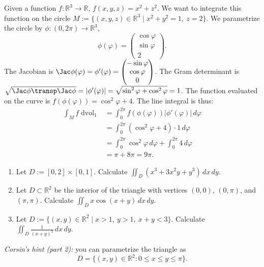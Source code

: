\begin{example}
\label{ex:line_integral_function_circle}
Given a function $f: \mathbb{R}^3 \to \mathbb{R}$, $f(x,y,z) = x^2+z^2$. We want to integrate this function on the circle $M := \{(x,y,z) \in \mathbb{R}^3 \mid x^2+y^2=1,\ z=2\}$.
We parametrize the circle by $\phi: (0,2\pi) \to \mathbb{R}^3$,
\[\phi(\varphi) = \begin{pmatrix} \cos\varphi \\ \sin\varphi \\ 2 \end{pmatrix}.\]
The Jacobian is $\Jac\phi(\varphi) = \phi'(\varphi) = \begin{pmatrix} -\sin\varphi \\ \cos\varphi \\ 0 \end{pmatrix}$.
The Gram determinant is $\sqrt{\Jac\phi\transp \Jac\phi} = |\phi'(\varphi)| = \sqrt{\sin^2\varphi + \cos^2\varphi} = 1$.
The function evaluated on the curve is $f(\phi(\varphi)) = \cos^2\varphi + 4$.
The line integral is thus:
\begin{align*}
\int_M f \mathop{d\text{vol}}_1 &= \int_0^{2\pi} f(\phi(\varphi)) |\phi'(\varphi)| \,d\varphi \\
&= \int_0^{2\pi} (\cos^2\varphi + 4) \cdot 1 \,d\varphi \\
&= \int_0^{2\pi} \cos^2\varphi \,d\varphi + \int_0^{2\pi} 4 \,d\varphi \\
&= \pi + 8\pi = 9\pi.
\end{align*}
\end{example}




\begin{exercise}
\label{ex:9.2}
\begin{enumerate}[label=\textbf{\arabic*.}]
  \item Let $D := [0,2]\times[0,1]$. Calculate $\displaystyle\iint_D (x^3+3x^2y+y^3)\,dx\,dy$.
  \item Let $D \subset \mathbb{R}^2$ be the interior of the triangle with vertices $(0,0)$,
    $(0,\pi)$, and $(\pi,\pi)$. Calculate $\displaystyle\iint_D x\cos(x+y)\,dx\,dy$.
  \item Let $D := \{(x,y)\in\mathbb{R}^2 \mid x>1,\ y>1,\ x+y<3\}$. Calculate
    $\displaystyle\iint_D \frac{1}{(x+y)^3}\,dx\,dy$.
\end{enumerate}

\textit{Corsin's hint (part 2):} you can parametrize the triangle as
\[D = \{(x,y)\in\mathbb{R}^2 : 0 \leq x \leq y \leq \pi\}.\]
\end{exercise}
